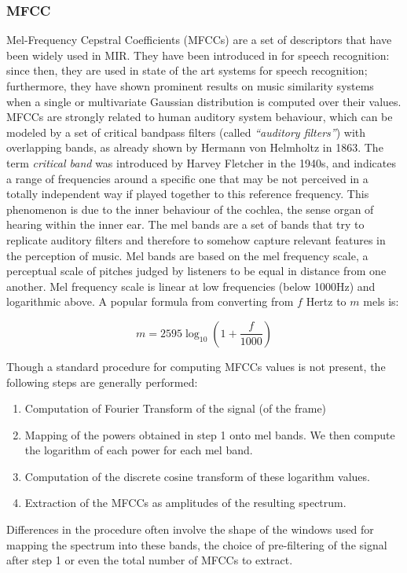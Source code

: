 \subsubsection{MFCC}
Mel-Frequency Cepstral Coefficients (MFCCs) are a set of descriptors that have been widely used in MIR. They have been introduced in \cite{davis80} for speech recognition: since then, they are used in state of the art systems for speech recognition; furthermore, they have shown prominent results on music similarity systems when a single or multivariate Gaussian distribution is computed over their values. \\MFCCs are strongly related to human auditory system behaviour, which can be modeled by a set of critical bandpass filters (called \textit{``auditory filters''}) with overlapping bands, as already shown by Hermann von Helmholtz in 1863. The term \textit{critical band} was introduced by Harvey Fletcher in the 1940s, and indicates a range of frequencies around a specific one that may be not perceived in a totally independent way if played together to this reference frequency. This phenomenon is due to the inner behaviour of the cochlea, the sense organ of hearing within the inner ear. The mel bands are a set of bands that try to replicate auditory filters and therefore to somehow capture relevant features in the perception of music. Mel bands are based on the mel frequency scale, a perceptual scale of pitches judged by listeners to be equal in distance from one another. Mel frequency scale is linear at low frequencies (below 1000Hz) and logarithmic above. A popular formula from converting from $f$ Hertz to $m$ mels is:

\begin{equation}
m = 2595\log_{10}\left(1 + \frac{f}{1000} \right)
\end{equation}

Though a standard procedure for computing MFCCs values is not present, the following steps are generally performed:
\begin{enumerate}
\item Computation of Fourier Transform of the signal (of the frame)
\item Mapping of the powers obtained in step 1 onto mel bands. We then compute the logarithm of each power for each mel band.
\item Computation of the discrete cosine transform of these logarithm values.
\item Extraction of the MFCCs as amplitudes of the resulting spectrum. 
\end{enumerate}
Differences in the procedure often involve the shape of the windows used for mapping the spectrum into these bands, the choice of pre-filtering of the signal after step 1 or even the total number of MFCCs to extract. 

